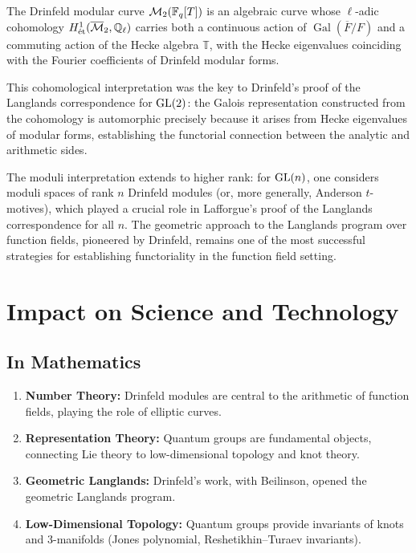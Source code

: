 \begin{theorem}[Drinfeld, 1974]
The Drinfeld modular curve $\mathcal{M}_2(\mathbb{F}_q[T])$ is an algebraic curve whose $\ell$-adic cohomology $H^1_{\text{\'et}}(\overline{\mathcal{M}}_2, \mathbb{Q}_\ell)$ carries both a continuous action of $\operatorname{Gal}(\overline{F}/F)$ and a commuting action of the Hecke algebra $\mathbb{T}$, with the Hecke eigenvalues coinciding with the Fourier coefficients of Drinfeld modular forms.
\end{theorem}

This cohomological interpretation was the key to Drinfeld's proof of the Langlands correspondence for $\operatorname{GL}(2)$: the Galois representation constructed from the cohomology is automorphic precisely because it arises from Hecke eigenvalues of modular forms, establishing the functorial connection between the analytic and arithmetic sides.

\begin{remark}
The moduli interpretation extends to higher rank: for $\operatorname{GL}(n)$, one considers moduli spaces of rank $n$ Drinfeld modules (or, more generally, Anderson $t$-motives), which played a crucial role in Lafforgue's proof of the Langlands correspondence for all $n$. The geometric approach to the Langlands program over function fields, pioneered by Drinfeld, remains one of the most successful strategies for establishing functoriality in the function field setting.
\end{remark}

\section{Impact on Science and Technology}

\subsection{In Mathematics}

\begin{enumerate}
    \item \textbf{Number Theory:} Drinfeld modules are central to the arithmetic of function fields, playing the role of elliptic curves.
    \item \textbf{Representation Theory:} Quantum groups are fundamental objects, connecting Lie theory to low-dimensional topology and knot theory.
    \item \textbf{Geometric Langlands:} Drinfeld's work, with Beilinson, opened the geometric Langlands program.
    \item \textbf{Low-Dimensional Topology:} Quantum groups provide invariants of knots and 3-manifolds (Jones polynomial, Reshetikhin--Turaev invariants).
\end{enumerate}

